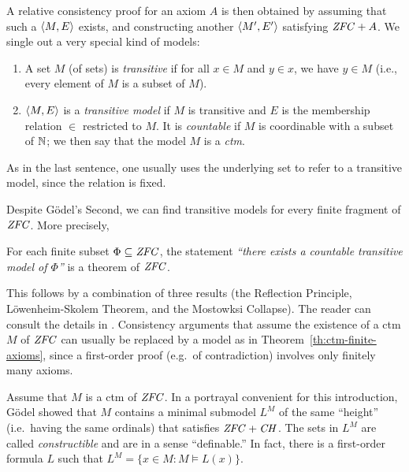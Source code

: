 A relative consistency proof for an axiom $A$ is then obtained by assuming that such a
$\langle M,E\rangle$ exists, and constructing another $\langle M',E'\rangle$
satisfying $\mathit{ZFC} + A$. We single out a very special kind of models:
%
\begin{definition}\label{def:transitive-model}
  \begin{enumerate}
  \item A set $M$ (of sets) is \emph{transitive} if for all $x\in M$ and 
    $y\in x$, we have $y\in M$ (i.e., every element of $M$ is a subset
    of $M$).
  \item $\langle M,E\rangle$ is a \emph{transitive model} if $M$ is transitive
     and  $E$ is the membership relation $\in$ restricted to
    $M$. It is \emph{countable} if $M$ is coordinable with a subset of
    $\mathbb{N}$; we then say that the model  $M$ is a \emph{ctm}. 
  \end{enumerate}
\end{definition}
%
As in the last sentence, one usually uses the underlying set to refer to a transitive
model, since the relation is fixed. 

Despite G\"odel's Second, we can find transitive models for every
finite fragment of $\mathit{ZFC}$. More precisely, 
%
\begin{theorem}\label{th:ctm-finite-axioms}
  For each finite subset
  $\Phi\subseteq \mathit{ZFC}$, the statement \emph{``there exists a countable
    transitive model of $\Phi$''} is a theorem of $\mathit{ZFC}$.
\end{theorem}
%
This follows by a
combination of three results (the Reflection Principle,
L\"owenheim-Skolem Theorem, and the Mostowksi Collapse). The reader
can consult the details in \cite{kunen2011set}. Consistency arguments that assume
the existence of a ctm $M$ of $\mathit{ZFC}$ can usually be replaced by a
model as in Theorem~\ref{th:ctm-finite-axioms}, since a first-order
proof (e.g.\ of contradiction) involves only finitely many axioms.

Assume that $M$ is a ctm of $\mathit{ZFC}$. In a portrayal convenient for this
introduction, G\"odel showed that $M$ contains a minimal submodel
$L^M$ of the same ``height'' (i.e.\ having the same ordinals)
that satisfies $\mathit{ZFC}+\mathit{CH}$. The sets in $L^M$ are called
\emph{constructible} and are in a sense ``definable.'' In fact, there
is a first-order formula $L$ such that $L^M = \{x\in M : M\models
L(x)\}$.


